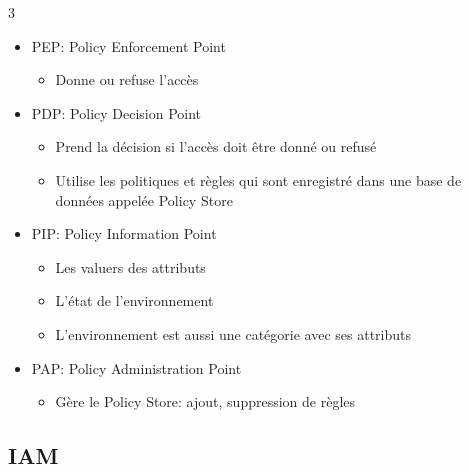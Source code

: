 \documentclass[9pt, a4paper, twoside]{article}
\begin{document}
\begin{multicols}{3}
\begin{itemize}[label=$\bullet$]
    \item \scriptsize PEP: Policy Enforcement Point
    \begin{itemize}[label=$\circ$]
        \item \scriptsize Donne ou refuse l'accès
    \end{itemize}
    \item \scriptsize PDP: Policy Decision Point
    \begin{itemize}[label=$\circ$]
        \item \scriptsize Prend la décision si l'accès doit être donné ou refusé
        \item \scriptsize Utilise les politiques et règles qui sont enregistré dans une base de données appelée Policy Store
    \end{itemize}
    \item \scriptsize PIP: Policy Information Point
    \begin{itemize}[label=$\circ$]
        \item \scriptsize Les valuers des attributs
        \item \scriptsize L'état de l'environnement
        \item \scriptsize L'environnement est aussi une catégorie avec ses attributs
    \end{itemize}
    \item \scriptsize PAP: Policy Administration Point
    \begin{itemize}[label=$\circ$]
        \item \scriptsize Gère le Policy Store: ajout, suppression de règles
    \end{itemize}
\end{itemize}

\footnotesize \subsection{IAM}


\end{multicols}
\end{document}
